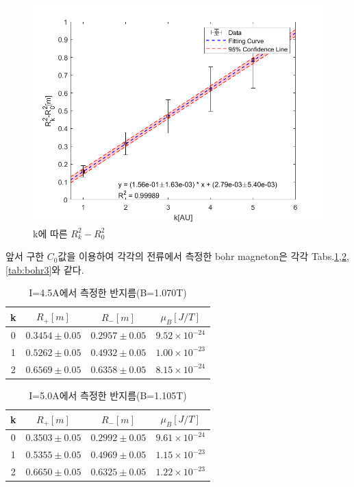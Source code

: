 \documentclass[%
 reprint,
 amsmath,amssymb,
 aps,
]{revtex4-2}
\begin{document}
\begin{figure}[htbp]
	\includegraphics[width = 0.95\linewidth]{Cfig.png}%
	\caption{\label{fig:Cfig}k에 따른 $R_{k}^{2}-R_{0}^{2}$}
\end{figure}

앞서 구한 $C_{0}$값을 이용하여 각각의 전류에서 측정한 bohr magneton은 각각 Tabs.\ref{tab:bohr1},\ref{tab:bohr2},\ref{tab:bohr3}와 같다.
\begin{table}[]
\begin{tabular}{c|c|c|c} \hline \hline
k & $R_{+}[m]$ & $R_{-}[m]$ & $\mu_{B}[J/T]$ \\ \hline
0&	$0.3454\pm0.05$&	$0.2957\pm0.05$&	$9.52\times10^{-24}$\\
1&	$0.5262\pm0.05$&	$0.4932\pm0.05$&	$1.00\times10^{-23}$\\
2&	$0.6569\pm0.05$&	$0.6358\pm0.05$&	$8.15\times10^{-24 }$\\ \hline \hline 
\end{tabular}
\caption{\label{tab:bohr1}I=4.5A에서 측정한 반지름(B=1.070T)}
\end{table}

\begin{table}[]
\begin{tabular}{c|c|c|c} \hline \hline
k & $R_{+}[m]$ & $R_{-}[m]$ & $\mu_{B}[J/T]$ \\ \hline
0&	$0.3503\pm0.05$&	$0.2992\pm0.05$&	$9.61\times10^{-24}$\\
1&	$0.5355\pm0.05$&	$0.4969\pm0.05$&	$1.15\times10^{-23}$\\
2&	$0.6650\pm0.05$&	$0.6325\pm0.05$&	$1.22\times10^{-23}$\\ \hline \hline 
\end{tabular}
\caption{\label{tab:bohr2}I=5.0A에서 측정한 반지름(B=1.105T)}
\end{table}
\end{document}

